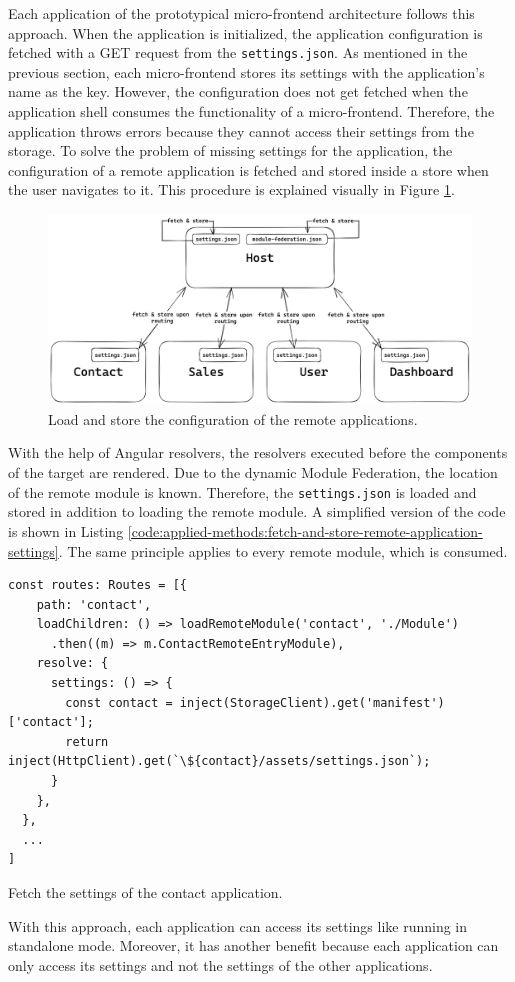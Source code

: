 Each application of the prototypical micro-frontend architecture follows this approach. When the application is initialized, the application configuration is fetched with a GET request from the \texttt{settings.json}. As mentioned in the previous section, each micro-frontend stores its settings with the application's name as the key. However, the configuration does not get fetched when the application shell consumes the functionality of a micro-frontend. Therefore, the application throws errors because they cannot access their settings from the storage. To solve the problem of missing settings for the application, the configuration of a remote application is fetched and stored inside a store when the user navigates to it. This procedure is explained visually in Figure \ref{fig:applied-methods:load-remote-settings}.

\ifshowImages
  \begin{figure}[H]
  \centering
  \includegraphics[width=0.9\linewidth]{images/applied-methods/prototypical-implementation/load-remote-settings.png}
  \caption{Load and store the configuration of the remote applications.}\label{fig:applied-methods:load-remote-settings}
  \end{figure}
\fi

\noindent With the help of Angular resolvers, the resolvers executed before the components of the target are rendered. Due to the dynamic Module Federation, the location of the remote module is known. Therefore, the \texttt{settings.json} is loaded and stored in addition to loading the remote module. A simplified version of the code is shown in Listing \ref{code:applied-methods:fetch-and-store-remote-application-settings}. The same principle applies to every remote module, which is consumed.

\ifshowListings
\begin{listing}[H]
\begin{verbatim}
const routes: Routes = [{
    path: 'contact',
    loadChildren: () => loadRemoteModule('contact', './Module')
      .then((m) => m.ContactRemoteEntryModule),
    resolve: {
      settings: () => {
        const contact = inject(StorageClient).get('manifest')['contact'];
        return inject(HttpClient).get(`\${contact}/assets/settings.json`);
      }
    },
  },
  ...
]
\end{verbatim}
\caption{Fetch the settings of the contact application.}\label{code:applied-methods:fetch-and-store-remote-application-settings}
\end{listing}
\fi

\noindent With this approach, each application can access its settings like running in standalone mode. Moreover, it has another benefit because each application can only access its settings and not the settings of the other applications. 
